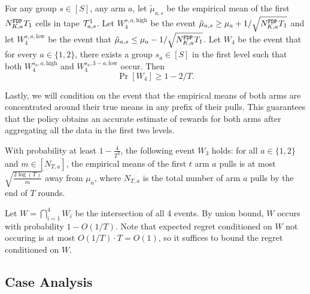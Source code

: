 \begin{lemma}\label{3levelw4}
  For any group $s\in [S]$, any arm $a$, let $\tilde\mu_{a,s}$ be the
  empirical mean of the first $N^\mathtt{FDP}_{K,a}  T_1$ cells in tape $\mathcal{T}^1_{a, s}$.
  Let $W_4^{s,a,\text{high}}$ be the event
  $\tilde\mu_{a, s} \geq \mu_a + 1/\sqrt{N^\mathtt{FDP}_{K,a}  T_1}$ and let
  $W_4^{s,a,\text{low}}$ be the event that
  $\tilde\mu_{a, s} \leq \mu_a - 1/\sqrt{N^\mathtt{FDP}_{K,a}  T_1}$.  Let $W_4$ be the
  event that for every $a\in \{1, 2\}$, there exists a group
  $s_a\in [S]$ in the first level such that both $W_4^{s_a,a,\text{high}}$
  and $W_4^{s_a,3-a,\text{low}}$ occur. Then
  \[
    \Pr[W_4]\geq 1 -2 /T.
  \]
\end{lemma}




Lastly, we will condition on the event that the empirical means of
both arms are concentrated around their true means in any prefix of
their pulls. This guarantees that the policy obtains an accurate
estimate of rewards for both arms after aggregating all the data in
the first two levels.


 

\begin{lemma}\label{3levelw3}
  With probability at least $1 - \frac{4}{T^3}$, the following event
  $W_3$ holds: for all $a\in \{1, 2\}$ and $m \in [N_{T, a}]$, the
  empirical means of the first $t$  arm $a$ pulls is at most
  $\sqrt{\frac{2\log(T)}{m}}$ away from $\mu_a$, where $N_{T, a}$ is
  the total number of arm $a$ pulls by the end of $T$ rounds.
\end{lemma}




Let $W = \bigcap_{i=1}^4 W_i$ be the intersection of all 4
events.  By union bound, $W$ occurs with probability $1-O(1/T)$. Note
that expected regret conditioned on $W$ not occuring is at most
$O(1/T) \cdot T = O(1)$, so it suffices to bound the regret conditioned on $W$.

\subsection{Case Analysis}

